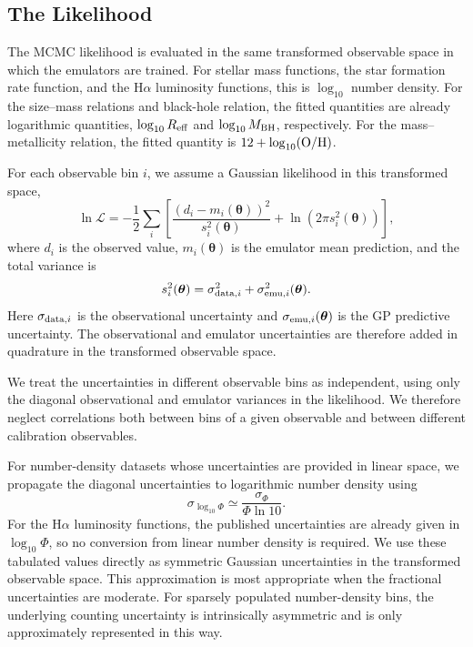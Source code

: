 \documentclass[twocolumn, apj, numberedappendix, iop]{openjournal}
\newcommand{\ha}{H$\alpha$}
\begin{document}
\subsection{The Likelihood}
\label{sec:likelihood}

The MCMC likelihood is evaluated in the same transformed observable space in
which the emulators are trained.  For stellar mass functions, the star
formation rate function, and the \ha{} luminosity functions, this is
$\log_{10}$ number density.  For the size--mass relations and black-hole
relation, the fitted quantities are already logarithmic quantities,
$\log_{10} R_{\rm eff}$ and $\log_{10} M_{\rm BH}$, respectively.  For the
mass--metallicity relation, the fitted quantity is $12+\log_{10}({\rm O/H})$.

For each observable bin $i$, we assume a Gaussian likelihood in this
transformed space,
\begin{equation}
  \ln \mathcal{L}
  =
  -\frac{1}{2}
  \sum_i
  \left[
    \frac{\left(d_i - m_i(\boldsymbol{\theta})\right)^2}
         {s_i^2(\boldsymbol{\theta})}
    +
    \ln\left(2\pi s_i^2(\boldsymbol{\theta})\right)
  \right],
\end{equation}
where $d_i$ is the observed value, $m_i(\boldsymbol{\theta})$ is the emulator
mean prediction, and the total variance is
\begin{equation}
  s_i^2(\boldsymbol{\theta})
  =
  \sigma_{{\rm data},i}^2
  +
  \sigma_{{\rm emu},i}^2(\boldsymbol{\theta}).
\end{equation}
Here $\sigma_{{\rm data},i}$ is the observational uncertainty and
$\sigma_{{\rm emu},i}(\boldsymbol{\theta})$ is the GP predictive uncertainty.
The observational and emulator uncertainties are therefore added in quadrature
in the transformed observable space.

We treat the uncertainties in different observable bins as independent, using
only the diagonal observational and emulator variances in the likelihood.
We therefore neglect correlations both between bins of a given observable and
between different calibration observables.

For number-density datasets whose uncertainties are provided in linear space,
we propagate the diagonal uncertainties to logarithmic number density using
\begin{equation}
  \sigma_{\log_{10}\Phi}
  \simeq
  \frac{\sigma_\Phi}{\Phi\ln 10}.
\end{equation}
For the \citet{2013MNRAS.428.1128S} \ha{} luminosity functions, the published
uncertainties are already given in $\log_{10}\Phi$, so no conversion from linear
number density is required. We use these tabulated values directly as symmetric
Gaussian uncertainties in the transformed observable space. This approximation is most appropriate when the fractional
uncertainties are moderate. For sparsely populated number-density bins, the underlying counting uncertainty is intrinsically asymmetric and is only approximately represented in this way.
\end{document}
